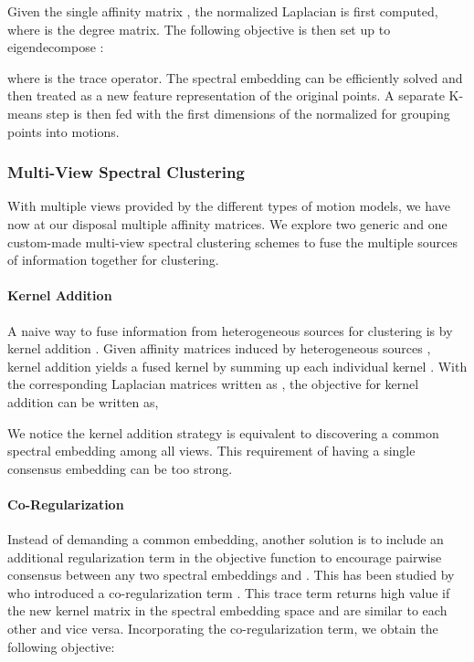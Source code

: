 \documentclass[10pt,twocolumn,letterpaper]{article}
\begin{document}
Given the single affinity matrix , the normalized Laplacian  is first computed, where  is the degree matrix. The following objective is then set up to eigendecompose : 


where  is the trace operator. The spectral embedding  can be efficiently solved and then treated as a new feature representation of the original points. A separate K-means step is then fed with the first  dimensions of the normalized  for grouping points into  motions.

\subsubsection{Multi-View Spectral Clustering}

With multiple views provided by the different types of motion models, we have now at our disposal multiple affinity matrices. We explore two generic and one custom-made multi-view spectral clustering schemes to fuse the multiple sources of information together for clustering.
\vspace{-0.2cm}
\paragraph{Kernel Addition} A naive way to fuse information from heterogeneous sources for clustering is by kernel addition \cite{Kumar2011}. Given affinity matrices induced by heterogeneous sources , kernel addition yields a fused kernel by summing up each individual kernel . With the corresponding Laplacian matrices written as , the objective for kernel addition can be written as,


\vspace{-0.2cm}


 We notice the kernel addition strategy is equivalent to discovering a common spectral embedding  among all views. This requirement of having a single consensus embedding can be too strong.

\vspace{-0.2cm}
 \paragraph{Co-Regularization} Instead of demanding a common embedding, another solution is to include an additional regularization term in the objective function to encourage pairwise consensus between any two spectral embeddings  and . This has been studied by \cite{Kumar2011} who introduced a co-regularization term . This trace term returns high value if the new kernel matrix in the spectral embedding space  and  are similar to each other and vice versa. Incorporating the co-regularization term, we obtain the following objective:
\vspace{-0.0cm}
\end{document}
